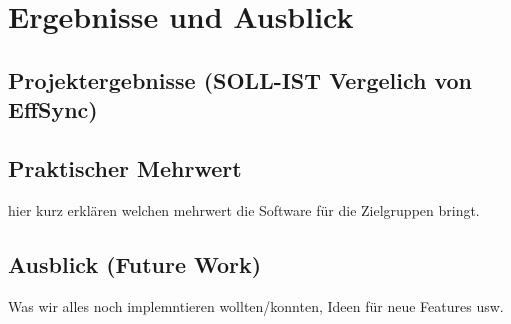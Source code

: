 \chapter{Ergebnisse und Ausblick}

\section{Projektergebnisse (SOLL-IST Vergelich von EffSync)}
\section{Praktischer Mehrwert}
hier kurz erklären welchen mehrwert die Software für die Zielgruppen bringt.
\section{Ausblick (Future Work)}
Was wir alles noch implemntieren wollten/konnten, Ideen für neue Features usw.
